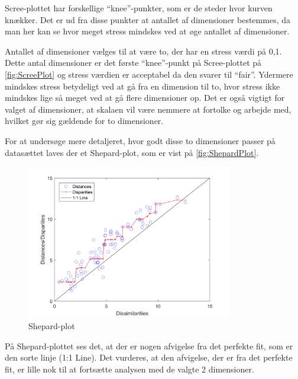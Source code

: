 \noindent Scree-plottet har forskellige ``knee''-punkter, som er de steder hvor kurven knækker. Det er ud fra disse punkter at antallet af dimensioner bestemmes, da man her kan se hvor meget stress mindskes ved at øge antallet af dimensioner. 

\noindent Antallet af dimensioner vælges til at være to, der har en stress værdi på 0,1. Dette antal dimensioner er det første ``knee''-punkt på Scree-plottet på \autoref{fig:ScreePlot} og stress værdien er acceptabel da den svarer til ``fair''. Ydermere mindskes stress betydeligt ved at gå fra en dimension til to, hvor stress ikke mindskes lige så meget ved at gå flere dimensioner op. Det er også vigtigt for valget af dimensioner, at skalaen vil være nemmere at fortolke og arbejde med, hvilket gør sig gældende for to dimensioner.

For at undersøge mere detaljeret, hvor godt disse to dimensioner passer på datasættet laves der et Shepard-plot, som er vist på \autoref{fig:ShepardPlot}.

\begin{figure}[H]
\centering
\includegraphics[width = 0.8\textwidth]{Figure/Sheppard_plot.png} 
\caption{Shepard-plot}
\label{fig:ShepardPlot}
\end{figure}

\noindent På Shepard-plottet ses det, at der er nogen afvigelse fra det perfekte fit, som er den sorte linje (1:1 Line). Det vurderes, at den afvigelse, der er fra det perfekte fit, er lille nok til at fortsætte analysen med de valgte 2 dimensioner. 

